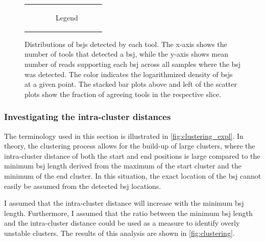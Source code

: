 \begin{figure}[ht]
\begin{tabular}{cc}
                                                                                                                                 &
               \begin{subfigure}{.4\textwidth}	     \centering
                       \caption{Legend}

                   \end{subfigure}\end{tabular} \caption{Distributions of
        \gls{bsj}s detected by
        each tool.
        The x-axis shows the number of tools that detected a \gls{bsj}, while the
        y-axis shows mean number of reads supporting each \gls{bsj} across all samples
        where the \gls{bsj} was detected.
        The color indicates the logarithmized density of \gls{bsj}s at a given point.
        The stacked bar plots above and left of the scatter plots show the fraction of
        agreeing tools in the respective slice.
    }
    \label{fig:detection_density}
\end{figure}

\subsubsection{Investigating the intra-cluster distances}

\noindent{}

The terminology used in this section is illustrated in
\cref{fig:clustering_expl}.
In theory, the clustering process allows for the build-up of large clusters,
where the intra-cluster distance of both the start and end positions is large
compared to the minimum \gls{bsj} length derived from the maximum of the start
cluster and the minimum of the end cluster.
In this situation, the exact location of the \gls{bsj} cannot easily be assumed
from the detected \gls{bsj} locations.

I assumed that the intra-cluster distance will increase with the minimum
\gls{bsj} length.
Furthermore, I assumed that the ratio between the minimum \gls{bsj} length and
the intra-cluster distance could be used as a measure to identify overly
unstable clusters.
The results of this analysis are shown in \cref{fig:clustering}.

